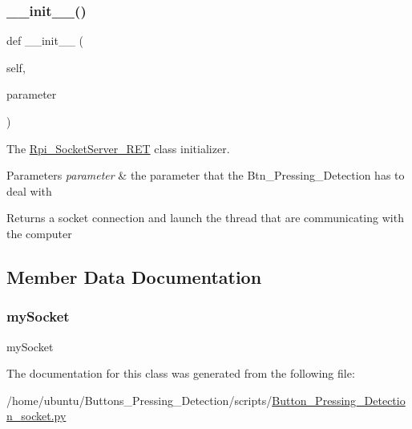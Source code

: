 \subsubsection{\texorpdfstring{\+\_\+\+\_\+init\+\_\+\+\_\+()}{\_\_init\_\_()}}
{\footnotesize\ttfamily def \+\_\+\+\_\+init\+\_\+\+\_\+ (\begin{DoxyParamCaption}\item[{}]{self,  }\item[{}]{parameter }\end{DoxyParamCaption})}



The \hyperlink{a00049}{Rpi\+\_\+\+Socket\+Server\+\_\+\+R\+ET} class initializer. 


\begin{DoxyParams}{Parameters}
{\em parameter} & the parameter that the Btn\+\_\+\+Pressing\+\_\+\+Detection has to deal with \\
\hline
\end{DoxyParams}
\begin{DoxyReturn}{Returns}
a socket connection and launch the thread that are communicating with the computer 
\end{DoxyReturn}


\subsection{Member Data Documentation}
\mbox{\label{a00049_ab4dca4dc93d7a4919b7881c73ba5ab1e}} 
\subsubsection{\texorpdfstring{my\+Socket}{mySocket}}
{\footnotesize\ttfamily my\+Socket}



The documentation for this class was generated from the following file\+:\begin{DoxyCompactItemize}
\item 
/home/ubuntu/\+Buttons\+\_\+\+Pressing\+\_\+\+Detection/scripts/\hyperlink{a00014}{Button\+\_\+\+Pressing\+\_\+\+Detection\+\_\+socket.\+py}\end{DoxyCompactItemize}
